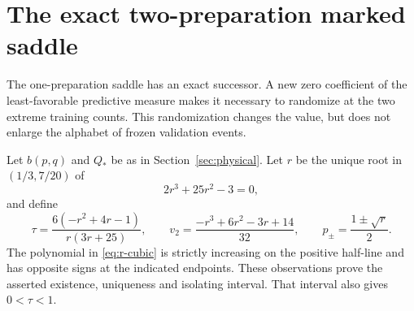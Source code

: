 \section{The exact two-preparation marked saddle}
\label{sec:two-saddle}
The one-preparation saddle has an exact successor. A new zero coefficient
of the least-favorable predictive measure makes it necessary to randomize
at the two extreme training counts. This randomization changes the value,
but does not enlarge the alphabet of frozen validation events.

Let $b(p,q)$ and $Q_*$ be as in Section~\ref{sec:physical}. Let $r$ be the
unique root in $(1/3,7/20)$ of
\begin{equation}\label{eq:r-cubic}
                     2r^3+25r^2-3=0,
\end{equation}
and define
\begin{equation}\label{eq:two-constants}
 \tau=\frac{6(-r^2+4r-1)}{r(3r+25)},\qquad
 v_2=\frac{-r^3+6r^2-3r+14}{32},\qquad
 p_\pm=\frac{1\pm\sqrt r}{2}.
\end{equation}
The polynomial in \eqref{eq:r-cubic} is strictly increasing on the positive
half-line and has opposite signs at the indicated endpoints. These
observations prove the asserted existence, uniqueness and isolating
interval. That interval also gives $0<\tau<1$.

